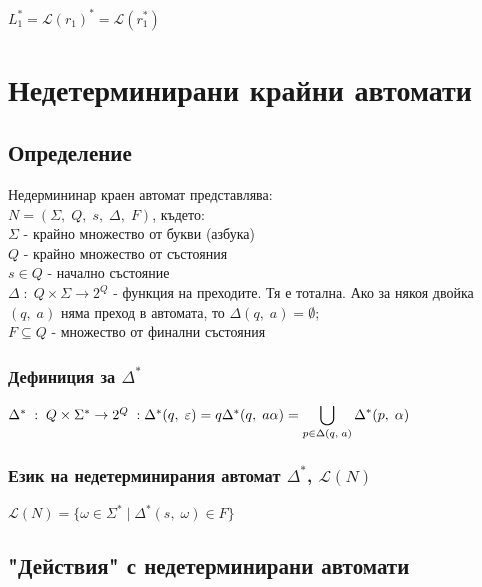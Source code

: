 \documentclass[12pt]{article}
\newcommand{\Lang}{\mathcal{L}}
\begin{document}
$L_1^* = \Lang(r_1)^* = \Lang(r_1^*)$

\section*{Недетерминирани крайни автомати}

\subsection*{Определение}

Недермининар краен автомат представлява: \\

$N = (\Sigma, \; Q, \; s, \; \Delta, \; F)$, където: \\

$\Sigma$ - крайно множество от букви (азбука) \\

$Q$ - крайно множество от състояния \\

$s \in Q$ - начално състояние \\

$\Delta \; : \; Q \times \Sigma \to 2^Q $ - функция на преходите. Тя е тотална. Ако за някоя двойка $(q, \; a)$ няма преход в автомата, то $\Delta(q, \; a) = \emptyset$; \\

$F \subseteq Q$ - множество от финални състояния \\

\subsubsection*{Дефиниция за $\Delta^*$}

$\Delta^* \; : \; Q\times\Sigma^* \to 2^Q \; : \; \\\\
\Delta^*(q, \; \varepsilon) = {q} \\\\
\Delta^*(q, \; a\alpha) = \displaystyle\bigcup_{p \in \Delta(q, \; a)} \Delta^*(p, \; \alpha) $

\subsubsection*{Език на недетерминирания автомат $\Delta^*$, $\Lang(N)$}

$\Lang(N) = \{\omega \in \Sigma^* \; | \; \Delta^*(s, \; \omega) \in F\}$

\subsection*{"Действия" с недетерминирани автомати}
\end{document}
